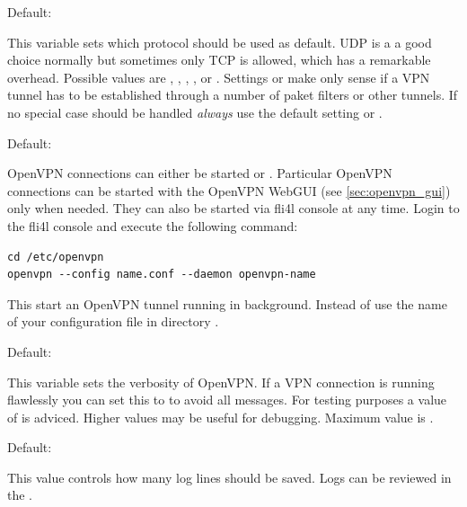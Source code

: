 \begin{description}
  Default: 

  This variable sets which protocol should be used as default. UDP is a 
  a good choice normally but sometimes only TCP is allowed, which has a 
  remarkable overhead. 
  Possible values are , , , 
  ,  or .
  Settings  or  make only sense 
  if a VPN tunnel has to be established through a number of paket filters 
  or other tunnels. If no special case should be handled \emph{always} 
  use the default setting  or .
  

  Default: 

  OpenVPN connections can either be started  or . 
  Particular OpenVPN connections can be started with the OpenVPN 
  WebGUI (see \ref{sec:openvpn_gui}) only when needed. They can also be 
  started via fli4l console at any time. Login to the fli4l console and 
  execute the following command:

\begin{verbatim}
cd /etc/openvpn
openvpn --config name.conf --daemon openvpn-name
\end{verbatim}

  This start an OpenVPN tunnel running in background. Instead of  
  use the name of your configuration file in directory .  


  Default: 

  This variable sets the verbosity of OpenVPN. If a VPN connection is running 
  flawlessly you can set this to  to avoid all messages. For testing 
  purposes a value of  is adviced. Higher values may be useful for 
  debugging. Maximum value is .


  Default: 

  This value controls how many log lines should be saved. Logs can be 
  reviewed in the .


\end{description}
